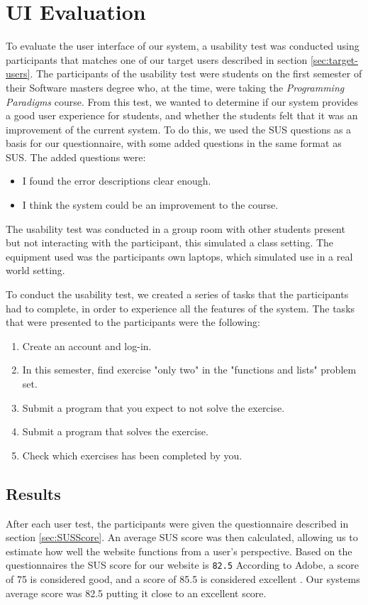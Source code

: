 \section{UI Evaluation} \label{UIEval}
To evaluate the user interface of our system, a usability test was conducted using participants that matches one of our target users described in section \ref{sec:target-users}.
The participants of the usability test were students on the first semester of their Software masters degree who, at the time, were taking the \textit{Programming Paradigms} course.
From this test, we wanted to determine if our system provides a good user experience for students, and whether the students felt that it was an improvement of the current system.
To do this, we used the SUS questions as a basis for our questionnaire, with some added questions in the same format as SUS. The added questions were:
\begin{itemize}
    \item I found the error descriptions clear enough.
    \item I think the system could be an improvement to the course.
\end{itemize}

The usability test was conducted in a group room with other students present but not interacting with the participant, this simulated a class setting.
The equipment used was the participants own laptops, which simulated use in a real world setting.

To conduct the usability test, we created a series of tasks that the participants had to complete, in order to experience all the features of the system.
The tasks that were presented to the participants were the following:
\begin{enumerate}
    \item Create an account and log-in.
    \item In this semester, find exercise "only two" in the "functions and lists" problem set.
    \item Submit a program that you expect to not solve the exercise.
    \item Submit a program that solves the exercise.
    \item Check which exercises has been completed by you.
\end{enumerate}


\subsection{Results} \label{UiResults}
After each user test, the participants were given the questionnaire described in section \ref{sec:SUSScore}.
An average SUS score was then calculated, allowing us to estimate how well the website functions from a user's perspective. Based on the questionnaires the SUS score for our website is \texttt{82.5}
According to Adobe, a score of 75 is considered good, and a score of 85.5 is considered excellent \cite{adobeSUS}. Our systems average score was 82.5 putting it close to an excellent score.

